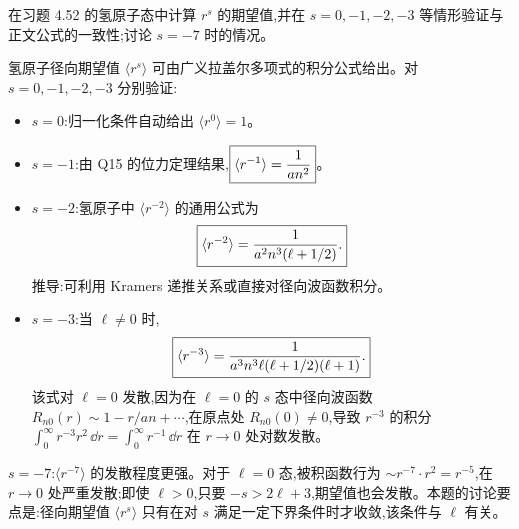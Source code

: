 \begin{question}
在习题 4.52 的氢原子态中计算 $r^s$ 的期望值,并在 $s=0,-1,-2,-3$ 等情形验证与正文公式的一致性;讨论 $s=-7$ 时的情况。
\end{question}
\begin{solution}
氢原子径向期望值 $\langle r^s\rangle$ 可由广义拉盖尔多项式的积分公式给出。对 $s=0,-1,-2,-3$ 分别验证:

\begin{itemize}
\item $s=0$:归一化条件自动给出 $\boxed{\langle r^0\rangle=1}$。
\item $s=-1$:由 Q15 的位力定理结果,$\boxed{\langle r^{-1}\rangle={1\over an^2}}$。
\item $s=-2$:氢原子中 $\langle r^{-2}\rangle$ 的通用公式为
\[
\boxed{\langle r^{-2}\rangle={1\over a^2 n^3(\ell+1/2)}.}
\]
推导:可利用 Kramers 递推关系或直接对径向波函数积分。
\item $s=-3$:当 $\ell\ne0$ 时,
\[
\boxed{\langle r^{-3}\rangle={1\over a^3 n^3\ell(\ell+1/2)(\ell+1)}.}
\]
该式对 $\ell=0$ 发散,因为在 $\ell=0$ 的 $s$ 态中径向波函数 $R_{n0}(r)\sim 1- r/a n + \cdots$,在原点处 $R_{n0}(0)\ne0$,导致 $r^{-3}$ 的积分 $\int_0^\infty r^{-3} r^2\,\dd r = \int_0^\infty r^{-1}\,\dd r$ 在 $r\to0$ 处对数发散。
\end{itemize}

\item $s=-7$:$\langle r^{-7}\rangle$ 的发散程度更强。对于 $\ell=0$ 态,被积函数行为 $\sim r^{-7}\cdot r^2 = r^{-5}$,在 $r\to0$ 处严重发散;即使 $\ell>0$,只要 $-s > 2\ell+3$,期望值也会发散。本题的讨论要点是:径向期望值 $\langle r^s\rangle$ 只有在对 $s$ 满足一定下界条件时才收敛,该条件与 $\ell$ 有关。
\end{solution}

